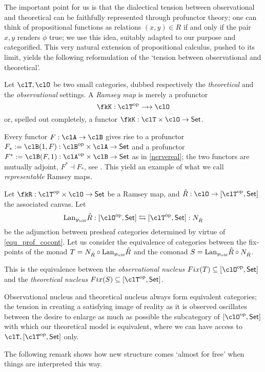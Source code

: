 The important point for us is that the dialectical tension between observational and theoretical can be faithfully represented through profunctor theory; one can think of propositional functions as relations $(x,y)\in R$ if and only if the pair $x,y$ renders $\phi$ true; we use this idea, suitably adapted to our purpose and categorified. This very natural extension of propositional calculus, pushed to its limit, yields the following reformulation of the `tension between observational and theoretical'.%
\begin{definition}\label{11_ramsey}
  Let $\clT,\clO$ be two small categories, dubbed respectively the \emph{theoretical} and the \emph{observational} settings. A \emph{Ramsey map} is merely a profunctor
  \[\fkK : \clT^\op \pto \clO\]
  or, spelled out completely, a functor $\fkK : \clT\times \clO \to \Set$.
\end{definition}
\begin{example}
  Every functor $F : \clA \to \clB$ gives rise to a profunctor $F_* := \clB(1,F) : \clB^\op\times \clA\to\Set$ and a profunctor $F^* := \clB(F,1) : \clA^\op\times\clB \to \Set$ as in \autoref{nervereal}; the two functors are mutually adjoint, $F^*\dashv F_*$, see \cite[6.2]{Bor2}. This yield an example of what we call \emph{representable} Ramsey maps.
\end{example}
\begin{definition}\label{nuclei}
  Let $\fkR : \clT^\op\times \clO \to\Set$ be a Ramsey map, and $\hat R : \clO \to [\clT^\op,\Set]$ the associated canvas. Let
  \[ \label{lalan} \Lan_{\yon_\clO}\hat R : [\clO^\op,\Set] \leftrightarrows [\clT^\op,\Set] : N_{\hat R} \]
  be the adjunction between presheaf categories determined by virtue of \autoref{equ_prof_cocont}. Let us consider the equivalence of categories between the fix-points of the monad $T = N_{\hat R}\circ\Lan_{\yon_\clO}\hat R$ and the comonad $S=\Lan_{\yon_\clO}\hat R\circ N_{\hat R}$.

  This is the equivalence between the \emph{observational nucleus} $Fix(T)\subseteq [\clO^\op,\Set]$ and the \emph{theoretical nucleus} $Fix(S)\subseteq [\clT^\op,\Set]$.
\end{definition}
\begin{remark}
  Observational nucleus and theoretical nucleus always form equivalent categories; the tension in creating a satisfying image of reality as it is observed oscillates between the desire to enlarge as much as possible the subcategory of $[\clO^\op,\Set]$ with which our theoretical model is equivalent, where we can have access to $\clT, [\clT^\op, \Set]$ only.
\end{remark}
The following remark shows how new structure comes `almost for free' when things are interpreted this way.

